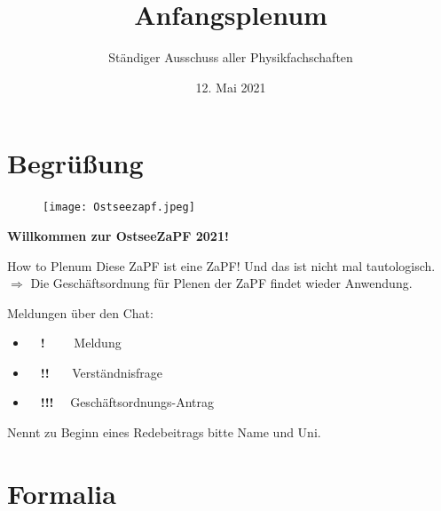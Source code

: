 \documentclass[compress, aspectratio=169]{beamer}
\title[Anfangsplenum]{Anfangsplenum}
\author{Ständiger Ausschuss aller Physikfachschaften}
\institute[Zusammenkunft aller Physikfachschaften]
\date{12. Mai 2021}
\begin{document}
	
	\section{Begrüßung}
	
	{
		\begin{frame}
			\begin{figure}
				\centering
				\texttt{[image: Ostseezapf.jpeg]}
			\end{figure}
			\centering
			\textbf{Willkommen zur OstseeZaPF 2021!}
		\end{frame}
	}
	
	\begin{frame}{How to Plenum}
		Diese ZaPF ist eine ZaPF! Und das ist nicht mal tautologisch.\\
		$\Rightarrow$ Die Geschäftsordnung für Plenen der ZaPF findet wieder Anwendung.
		
		\vspace{.5cm}
		Meldungen über den Chat:
		\begin{itemize}
			\item$\quad$\textbf{!}$\quad$ \ \ Meldung
			\item$\quad$\textbf{!!}$\quad$ \ Verständnisfrage
			\item$\quad$\textbf{!!!}$\quad$ Geschäftsordnungs-Antrag
		\end{itemize}
		\vspace{.5cm}
		Nennt zu Beginn eines Redebeitrags bitte Name und Uni.
	\end{frame}
	
	\section{Formalia}
	
\end{document}
